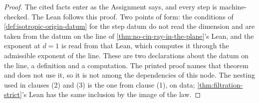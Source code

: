 \begin{proof}
The cited facts enter as the Assignment says, and every step is machine-checked. The Lean
follows this proof. Two points of form: the conditions of \ref{def:isotropic-origin-datum} for
the step datum do not read the dimension and are taken from the datum on the line of
\ref{thm:no-cin-ray-in-the-plane}'s Lean, and the exponent at $d = 1$ is read from that Lean,
which computes it through the admissible exponent of the line. These are two declarations
about the datum on the line, a definition and a computation. The printed proof names that
theorem and does not use it, so it is not among the dependencies of this node. The nesting used
in clauses (2)
and (3) is the one from clause (1), on data; \ref{thm:filtration-strict}'s Lean has the same
inclusion by the image of the law.
\end{proof}

